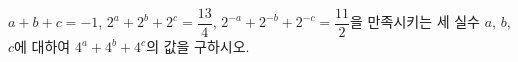 $a+b+c=-1$, $2^a+2^b+2^c=\dfrac{13}{4}$, $2^{-a}+2^{-b}+2^{-c}=\dfrac{11}{2}$을 만족시키는 세 실수 $a$, $b$, $c$에 대하여 $4^a+4^b+4^c$의 값을 구하시오.
